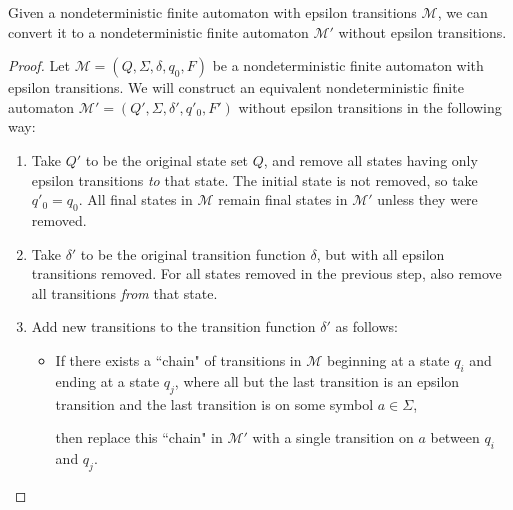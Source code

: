 \begin{theorem}\label{thm:NFAepsilontoNFA}
Given a nondeterministic finite automaton with epsilon transitions $\mathcal{M}$, we can convert it to a nondeterministic finite automaton $\mathcal{M}'$ without epsilon transitions.

\begin{proof}
Let $\mathcal{M} = (Q, \Sigma, \delta, q_{0}, F)$ be a nondeterministic finite automaton with epsilon transitions. We will construct an equivalent nondeterministic finite automaton $\mathcal{M}' = (Q', \Sigma, \delta', q'_{0}, F')$ without epsilon transitions in the following way:
\begin{enumerate}
\item Take $Q'$ to be the original state set $Q$, and remove all states having only epsilon transitions \emph{to} that state. The initial state is not removed, so take $q'_{0} = q_{0}$. All final states in $\mathcal{M}$ remain final states in $\mathcal{M}'$ unless they were removed.
\item Take $\delta'$ to be the original transition function $\delta$, but with all epsilon transitions removed. For all states removed in the previous step, also remove all transitions \emph{from} that state.
\item Add new transitions to the transition function $\delta'$ as follows:
	\begin{itemize}
	\item If there exists a ``chain" of transitions in $\mathcal{M}$ beginning at a state $q_{i}$ and ending at a state $q_{j}$, where all but the last transition is an epsilon transition and the last transition is on some symbol $a \in \Sigma$,
\begin{center}
\end{center}
	then replace this ``chain" in $\mathcal{M}'$ with a single transition on $a$ between $q_{i}$ and $q_{j}$.
\begin{center}
\end{center}
\end{itemize}
\end{enumerate}
\end{proof}
\end{theorem}
